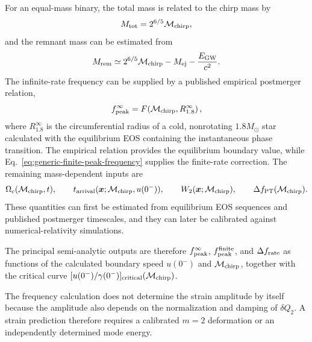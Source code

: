 \documentclass[11pt]{article}
\begin{document}
For an equal-mass binary, the total mass is related to the chirp mass by
\begin{equation}
M_{\rm tot}=2^{6/5}\mathcal{M}_{\rm chirp},
\end{equation}
and the remnant mass can be estimated from
\begin{equation}
M_{\rm rem}
\simeq
2^{6/5}\mathcal{M}_{\rm chirp}
-M_{\rm ej}
-\frac{E_{\rm GW}}{c^2}.
\end{equation}
The infinite-rate frequency can be supplied by a published empirical postmerger relation,
\begin{equation}
f_{\rm peak}^{\infty}
=
F\!\left(
\mathcal{M}_{\rm chirp},
R_{1.8}^{\infty}
\right),
\label{eq:infinite-frequency-empirical-input}
\end{equation}
where \(R_{1.8}^{\infty}\) is the circumferential radius of a cold, nonrotating \(1.8M_\odot\) star calculated with the equilibrium EOS containing the instantaneous phase transition.
The empirical relation provides the equilibrium boundary value, while Eq.~\eqref{eq:generic-finite-peak-frequency} supplies the finite-rate correction.
The remaining mass-dependent inputs are
\begin{equation}
\Omega_c(\mathcal{M}_{\rm chirp},t),
\qquad
t_{\rm arrival}(\boldsymbol{x};\mathcal{M}_{\rm chirp},u(0^-)),
\qquad
W_2(\boldsymbol{x};\mathcal{M}_{\rm chirp}),
\qquad
\Delta f_{\rm PT}(\mathcal{M}_{\rm chirp}).
\end{equation}
These quantities can first be estimated from equilibrium EOS sequences and published postmerger timescales, and they can later be calibrated against numerical-relativity simulations.

The principal semi-analytic outputs are therefore \(f_{\rm peak}^{\infty}\), \(f_{\rm peak}^{\rm finite}\), and \(\Delta f_{\rm rate}\) as functions of the calculated boundary speed \(u(0^-)\) and \(\mathcal{M}_{\rm chirp}\), together with the critical curve \([u(0^-)/\gamma(0^-)]_{\rm critical}(\mathcal{M}_{\rm chirp})\).

The frequency calculation does not determine the strain amplitude by itself because the amplitude also depends on the normalization and damping of \(\delta Q_2\).
A strain prediction therefore requires a calibrated \(m=2\) deformation or an independently determined mode energy.


\end{document}
